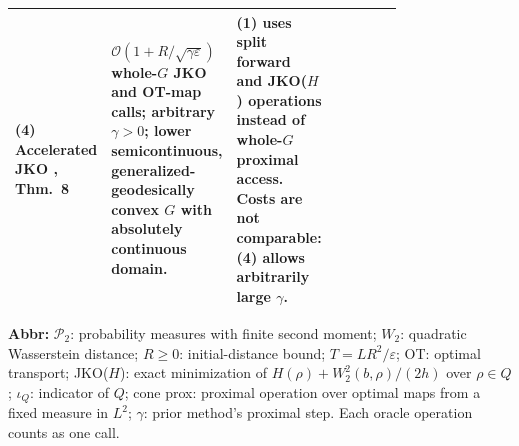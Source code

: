 \begin{table}[tp]
\begin{threeparttable}
\begin{tabularx}{\linewidth}{@{}>{\raggedright\arraybackslash}p{0.20\linewidth}>{\raggedright\arraybackslash}p{0.32\linewidth}>{\raggedright\arraybackslash}p{0.25\linewidth}>{\raggedright\arraybackslash}X@{}}
\midrule
\textbf{(4)} Accelerated JKO \citep{wscChangUndated}, Thm.~8 & $\mathcal{O}(1+R/\sqrt{\gamma\varepsilon})$ whole-$G$ JKO and OT-map calls; arbitrary $\gamma>0$; lower semicontinuous, generalized-geodesically convex $G$ with absolutely continuous domain. & \textbf{(1)} uses split forward and JKO($H$) operations instead of whole-$G$ proximal access. Costs are not comparable: \textbf{(4)} allows arbitrarily large $\gamma$. & \\
\bottomrule
\end{tabularx}
\begin{tablenotes}[flushleft]\footnotesize
\item[] \textbf{Abbr:} $\mathcal P_2$: probability measures with finite second moment; $W_2$: quadratic Wasserstein distance; $R\ge0$: initial-distance bound; $T=LR^2/\varepsilon$; OT: optimal transport; JKO($H$): exact minimization of $H(\rho)+W_2^2(b,\rho)/(2h)$ over $\rho\in Q$; $\iota_Q$: indicator of $Q$; cone prox: proximal operation over optimal maps from a fixed measure in $L^2$; $\gamma$: prior method's proximal step. Each oracle operation counts as one call.
\end{tablenotes}
\end{threeparttable}
\end{table}
\clearpage
